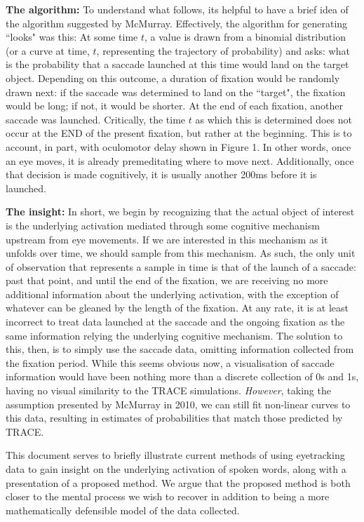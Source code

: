 \documentclass{article}
\begin{document}
\textbf{The algorithm: } To understand what follows, its helpful to have a brief idea of the algorithm suggested by McMurray. Effectively, the algorithm for generating ``looks" was this: At some time $t$, a value is drawn from a binomial distribution (or a curve at time, $t$, representing the trajectory of probability) and asks: what is the probability that a saccade launched at this time would land on the target object. Depending on this outcome, a duration of fixation would be randomly drawn next: if the saccade was determined to land on the ``target", the fixation would be long; if not, it would be shorter. At the end of each fixation, another saccade was launched. Critically, the time $t$ as which this is determined does not occur at the END of the present fixation, but rather at the beginning. This is to account, in part, with oculomotor delay shown in Figure 1. In other words, once an eye moves, it is already premeditating where to move next. Additionally, once that decision is made cognitively, it is usually another 200ms before it is launched.

\textbf{The insight:} In short, we begin by recognizing that the actual object of interest is the underlying activation mediated through some cognitive mechanism upstream from eye movements. If we are interested in this mechanism as it unfolds over time, we should sample from this mechanism. As such, the only unit of observation that represents a sample in time is that of the launch of a saccade: past that point, and until the end of the fixation, we are receiving no more additional information about the underlying activation, with the exception of whatever can be gleaned by the length of the fixation. At any rate, it is at least incorrect to treat data launched at the saccade and the ongoing fixation as the same information relying the underlying cognitive mechanism.
The solution to this, then, is to simply use the saccade data, omitting information collected from the fixation period. While this seems obvious now, a visualisation of saccade information would have been nothing more than a discrete collection of 0s and 1s, having no visual similarity to the TRACE simulations. \textit{However}, taking the assumption presented by McMurray in 2010, we can still fit non-linear curves to this data, resulting in estimates of probabilities that match those predicted by TRACE.

This document serves to briefly illustrate current methods of using eyetracking data to gain insight on the underlying activation of spoken words, along with a presentation of a proposed method. We argue that the proposed method is both closer to the mental process we wish to recover in addition to being a more mathematically defensible model of the data collected.
\end{document}
